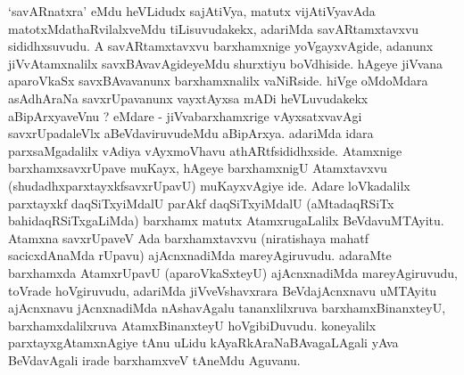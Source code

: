 \begin{artha}
`savARnatxra' eMdu heVLidudx sajAtiVya, matutx vijAtiVyavAda matotxMdathaRvilalxveMdu tiLisuvudakekx, adariMda savARtamxtavxvu sididhxsuvudu. A savARtamxtavxvu barxhamxnige yoVgayxvAgide, adanunx jiVvAtamxnalilx savxBAvavAgideyeMdu shurxtiyu boVdhiside. hAgeye jiVvana aparoVkaSx savxBAvavanunx barxhamxnalilx vaNiRside. hiVge oMdoMdara asAdhAraNa savxrUpavanunx vayxtAyxsa mADi heVLuvudakekx aBipArxyaveVnu ? eMdare - jiVvabarxhamxrige vAyxsatxvavAgi savxrUpadaleVlx aBeVdaviruvudeMdu aBipArxya. adariMda idara parxsaMgadalilx vAdiya vAyxmoVhavu athARtfsididhxside. Atamxnige barxhamxsavxrUpave muKayx, hAgeye barxhamxnigU Atamxtavxvu (shudadhxparxtayxkfsavxrUpavU) muKayxvAgiye ide. Adare loVkadalilx parxtayxkf daqSiTxyiMdalU parAkf daqSiTxyiMdalU (aMtadaqRSiTx bahidaqRSiTxgaLiMda) barxhamx matutx AtamxrugaLalilx BeVdavuMTAyitu. Atamxna savxrUpaveV Ada barxhamxtavxvu (niratishaya mahatf sacicxdAnaMda rUpavu) ajAcnxnadiMda mareyAgiruvudu. adaraMte barxhamxda AtamxrUpavU (aparoVkaSxteyU) ajAcnxnadiMda mareyAgiruvudu, toVrade hoVgiruvudu, adariMda jiVveVshavxrara BeVdajAcnxnavu uMTAyitu ajAcnxnavu jAcnxnadiMda nAshavAgalu tananxlilxruva barxhamxBinanxteyU, barxhamxdalilxruva AtamxBinanxteyU hoVgibiDuvudu. koneyalilx parxtayxgAtamxnAgiye tAnu uLidu kAyaRkAraNaBAvagaLAgali yAva BeVdavAgali irade barxhamxveV tAneMdu Aguvanu. 
\end{artha}

